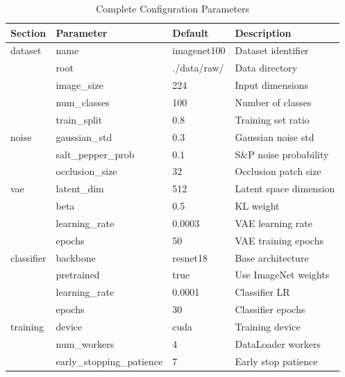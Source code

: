 \documentclass[11pt,a4paper]{article}
\begin{document}
\begin{table}[H]
    \centering
    \caption{Complete Configuration Parameters}
    \begin{tabular}{llll}
        \toprule
        \textbf{Section} & \textbf{Parameter} & \textbf{Default} & \textbf{Description} \\
        \midrule
        dataset & name & imagenet100 & Dataset identifier \\
        & root & ./data/raw/ & Data directory \\
        & image\_size & 224 & Input dimensions \\
        & num\_classes & 100 & Number of classes \\
        & train\_split & 0.8 & Training set ratio \\
        \midrule
        noise & gaussian\_std & 0.3 & Gaussian noise std \\
        & salt\_pepper\_prob & 0.1 & S\&P noise probability \\
        & occlusion\_size & 32 & Occlusion patch size \\
        \midrule
        vae & latent\_dim & 512 & Latent space dimension \\
        & beta & 0.5 & KL weight \\
        & learning\_rate & 0.0003 & VAE learning rate \\
        & epochs & 50 & VAE training epochs \\
        \midrule
        classifier & backbone & resnet18 & Base architecture \\
        & pretrained & true & Use ImageNet weights \\
        & learning\_rate & 0.0001 & Classifier LR \\
        & epochs & 30 & Classifier epochs \\
        \midrule
        training & device & cuda & Training device \\
        & num\_workers & 4 & DataLoader workers \\
        & early\_stopping\_patience & 7 & Early stop patience \\
        \bottomrule
    \end{tabular}
\end{table}

\end{document}
